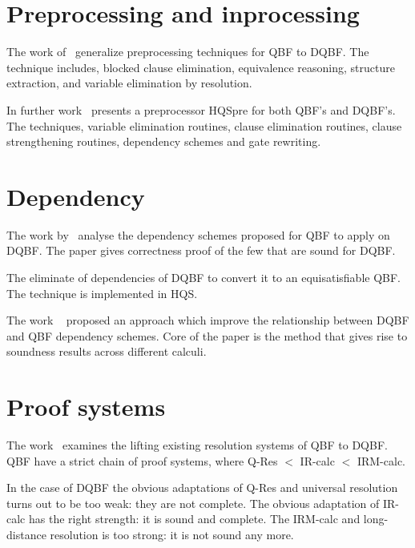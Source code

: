 \documentclass[runningheads]{llncs}
\begin{document}
\section{Preprocessing and inprocessing}
The work of~\cite{wimmer2015preprocessing} generalize preprocessing techniques for QBF to DQBF.
%
The technique includes, blocked clause elimination, equivalence reasoning, structure extraction, and variable elimination by resolution.

In further work~\cite{wimmer2017hqspre} presents a preprocessor HQSpre for both QBF's and DQBF's.
%
The techniques, variable elimination routines, clause elimination routines, clause strengthening routines, dependency schemes and gate rewriting.

\section{Dependency}
The work by~\cite{wimmer2016dependency} analyse the dependency
schemes proposed for QBF to apply on DQBF.
%
The paper gives correctness proof of the few that are sound for DQBF.
%

The \cite{wimmer2017dqbf} eliminate of dependencies of DQBF to convert it to an equisatisfiable QBF.
%
The technique is implemented in HQS.



The work ~\cite{beyersdorff2018reinterpreting} proposed an approach which improve the relationship between DQBF and QBF
dependency schemes.
%
Core of the paper is the method that gives rise to soundness results across different calculi.

\section{Proof systems}
The work~\cite{beyersdorff2016lifting} examines the lifting existing resolution systems of QBF to DQBF.
%
QBF have a strict chain of proof systems, where Q-Res $<$ IR-calc $<$ IRM-calc.
%

In the case of DQBF the obvious adaptations of Q-Res and universal resolution turns out to be too weak: they are not complete.
%
The obvious adaptation of IR-calc has
the right strength: it is sound and complete.
%
The IRM-calc and long-distance resolution is too strong: it is not sound any more.
\end{document}

